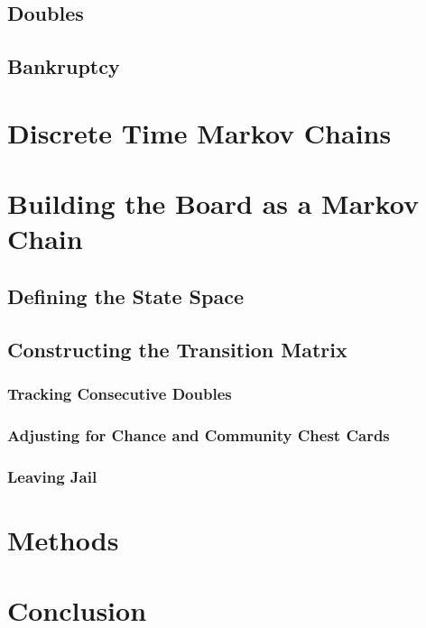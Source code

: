 \documentclass[12pt]{article}
\begin{document}
\subsection{Doubles}

\subsection{Bankruptcy}

%
\section{Discrete Time Markov Chains}

%
\section{Building the Board as a Markov Chain}

%
\subsection{Defining the State Space}

%
\subsection{Constructing the Transition Matrix}

%
\subsubsection{Tracking Consecutive Doubles}

%
\subsubsection{Adjusting for Chance and Community Chest Cards}

%
\subsubsection{Leaving Jail}

%
\section{Methods}\label{sec:methods}

%
\section{Conclusion}\label{sec:conclusion}



\newpage


\end{document}
